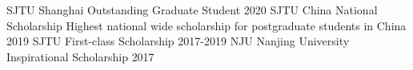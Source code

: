 \begin{cvhonors}

\cvhonor
	{SJTU} %
	{Shanghai Outstanding Graduate Student}
	{} %
	{2020}
\cvhonor
	{SJTU} %
	{China National Scholarship}
	{{\color{red}Highest} national wide scholarship for postgraduate students in China} %
	{2019}
\cvhonor
	{SJTU} %
	{First-class Scholarship}
	{} %
	{2017-2019}
\cvhonor
	{NJU} %
	{Nanjing University Inspirational Scholarship}
	{} %
	{2017}

\end{cvhonors}
